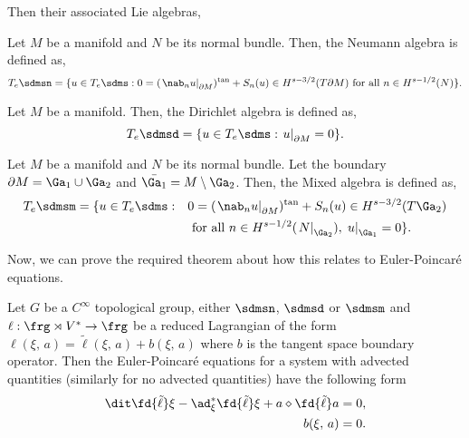 \noindent
Then their associated Lie algebras,
\begin{ndefi}
  Let $M$ be a manifold and $N$ be its normal bundle. Then, the Neumann algebra is defined as,
  $$ T_e\sdmsn = \{ u \in T_e\sdms : 0 = (\left.\nab_n u\right|_{\partial M})^{\text{tan}} + S_n(u)\in H^{s - 3/2}(T\partial M) \text{ for all } n \in H^{s - 1/2}(N) \}. $$
\end{ndefi}
\begin{ndefi}
  Let $M$ be a manifold. Then, the Dirichlet algebra is defined as,
  $$ T_e\sdmsd =  \{ u \in T_e\sdms : \left. u \right|_{\partial M} = 0\}. $$
\end{ndefi}
\begin{ndefi}
  Let $M$ be a manifold and $N$ be its normal bundle. Let the boundary $\partial M = \Ga_1 \cup \Ga_2$ and $\bar{\Ga_1} = M \setminus \Ga_2$. Then, the Mixed algebra is defined as,
  \begin{align*}
    T_e\sdmsm = \{ u \in T_e\sdms :\quad &0 = (\left.\nab_n u\right|_{\partial M})^{\text{tan}} + S_n(u)\in H^{s - 3/2}(T\Ga_2)\\
    &\text{ for all } n \in H^{s - 1/2} (\left.N\right|_{\Ga_2}),\, \left. u \right|_{\Ga_1} = 0\}.
  \end{align*}
\end{ndefi}
\noindent
Now, we can prove the required theorem about how this relates to Euler-Poincar\'e equations.
\begin{nthm}
  Let $G$ be a $C^\infty$ topological group, either $\sdmsn$, $\sdmsd$ or $\sdmsm$ and $\ell : \frg \rtimes V^* \to \frg$ be a reduced Lagrangian of the form $\ell(\xi,\, a) = \tilde \ell(\xi,\,a) + b(\xi,\,a)$ where $b$ is the tangent space boundary operator. Then the Euler-Poincar\'e equations for a system with advected quantities (similarly for no advected quantities) have the following form
  \begin{equation}
    \begin{split}
      \dit \fd {\tilde \ell} \xi - \ad_\xi^* \fd {\tilde \ell} \xi + a \diamond \fd {\tilde \ell} a &= 0, \\
      b(\xi,\, a) & =0.
    \end{split}\label{eq:epa_bc}
  \end{equation}
\end{nthm}
